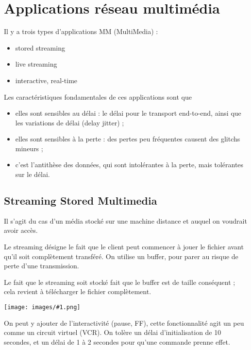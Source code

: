 \documentclass[10pt,a4paper]{report}
\newcommand{\dessin}[1]{\begin{center}\texttt{[image: images/\#1.png]}\end{center}}
\begin{document}
	
	\section{Applications réseau multimédia}
	
	Il y a trois types d'applications MM (MultiMedia) :
	
	\begin{itemize}
		\item stored streaming
		\item live streaming
		\item interactive, real-time
	\end{itemize}
	
	Les caractéristiques fondamentales de ces applications sont que
	
	\begin{itemize}
		\item elles sont sensibles au délai : le délai pour le transport end-to-end, ainsi que les variations de délai (delay jitter) ;
		\item elles sont sensibles à la perte : des pertes peu fréquentes causent des glitchs mineurs ;
		\item c'est l'antithèse des données, qui sont intolérantes à la perte, mais tolérantes sur le délai.
	\end{itemize}
	
		\subsection{Streaming Stored Multimedia}
	
		Il s'agit du cas d'un média stocké sur une machine distance et auquel on voudrait avoir accès.
		
		Le streaming désigne le fait que le client peut commencer à jouer le fichier avant qu'il soit complètement transféré. On utilise un buffer, pour parer au risque de perte d'une transmission.
		
		Le fait que le streaming soit stocké fait que le buffer est de taille conséquent ; cela revient à télécharger le fichier complètement.
		
		\dessin{63}
		
		On peut y ajouter de l'interactivité (pause, FF), cette fonctionnalité agit un peu comme un circuit virtuel (VCR). On tolère un délai d'initialisation de 10 secondes, et un délai de 1 à 2 secondes pour qu'une commande prenne effet.
		
\end{document}
